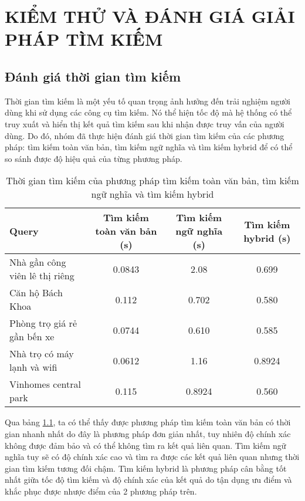 \chapter{KIỂM THỬ VÀ ĐÁNH GIÁ GIẢI PHÁP TÌM KIẾM}
\section{Đánh giá thời gian tìm kiếm}
 \hspace*{1cm}Thời gian tìm kiếm là một yếu tố quan trọng ảnh hưởng đến trải nghiệm người dùng khi sử dụng các công cụ tìm kiếm. Nó thể hiện tốc độ mà hệ thống có thể truy xuất và hiển thị kết quả tìm kiếm sau khi nhận được truy vấn của người dùng. Do đó, nhóm đã thực hiện đánh giá thời gian tìm kiếm của các phương pháp: tìm kiếm toàn văn bản, tìm kiếm ngữ nghĩa và tìm kiếm hybrid để có thể so sánh được độ hiệu quả của từng phương pháp.
\begin{table}[H]
    \centering
        \caption{Thời gian tìm kiếm của phương pháp tìm kiếm toàn văn bản, tìm kiếm ngữ nghĩa và tìm kiếm hybrid}
    \begin{tabular}{|l|c|c|c|}
    \hline
        Query & Tìm kiếm toàn văn bản (s) & Tìm kiếm ngữ nghĩa (s) & \textbf{Tìm kiếm hybrid} (s) \\
        \hline
        \hline
        Nhà gần công viên lê thị riêng & 0.0843 & 2.08 & 0.699 \\
        Căn hộ Bách Khoa & 0.112 & 0.702 & 0.580 \\
        Phòng trọ giá rẻ gần bến xe & 0.0744 & 0.610 & 0.585 \\
        Nhà trọ có máy lạnh và wifi & 0.0612 & 1.16 & 0.8924 \\
        Vinhomes central park & 0.115 & 0.8924 & 0.560  \\
\hline
    \end{tabular}
    \label{tab:results_time}
\end{table}

\hspace*{1cm}Qua bảng \ref{tab:results_time}, ta có thể thấy được phương pháp tìm kiếm toàn văn bản có thời gian nhanh nhất do đây là phương pháp đơn giản nhất, tuy nhiên độ chính xác không được đảm bảo và có thể không tìm ra kết quả liên quan. Tìm kiếm ngữ nghĩa tuy sẽ có độ chính xác cao và tìm ra được các kết quả liên quan nhưng thời gian tìm kiếm tương đối chậm. Tìm kiếm hybrid là phương pháp cân bằng tốt nhất giữa tốc độ tìm kiếm và độ chính xác của kết quả do tận dụng ưu điểm và khắc phục được nhược điểm của 2 phương pháp trên.


